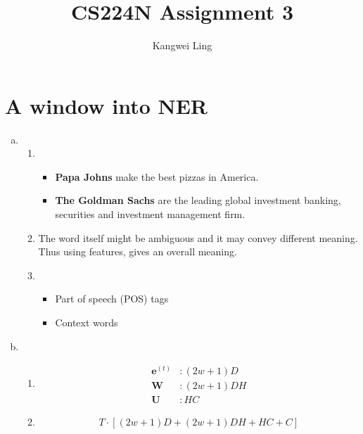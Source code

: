 \documentclass{article}[11pt]
\title{CS224N Assignment 3}
\author{Kangwei Ling}
\newcommand{\bW} { \bm{W} }
\newcommand{\bU} { \bm{U} }
\newcommand{\be} { \bm{e}}
\newcommand{\bet}[1][t]{ \be^{(#1)}}
\begin{document}
\maketitle

\section{A window into NER}

\begin{enumerate}[(a)]
\item 
	\begin{enumerate}[(i.)]
	\item 
		\begin{itemize}
		\item \textbf{Papa Johns} make the best pizzas in America.
		\item \textbf{The Goldman Sachs} are the leading global investment banking, securities and investment management firm.
		\end{itemize}
	\item 
		The word itself might be ambiguous and it may convey different meaning.
		Thus using features, gives an overall meaning.
		
	\item
		\begin{itemize}
		\item Part of speech (POS) tags
		\item Context words  
		\end{itemize}
		\end{enumerate}
\item
	\begin{enumerate}[(i.)]
	\item 
		\begin{align*}
		\bet &: (2w+1)D \\
		\bW  &: (2w+1)DH \\
		\bU  &: HC
		\end{align*}
		\item \[T \cdot [(2w+1)D +  (2w+1)DH + HC + C]\]
	\end{enumerate}
\end{enumerate}
\end{document}
